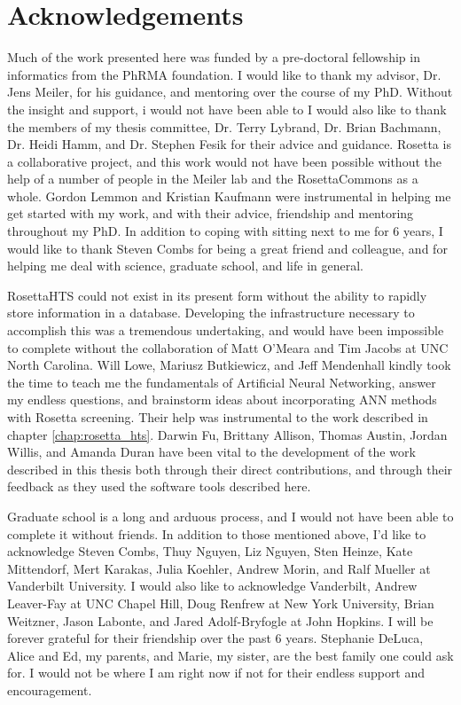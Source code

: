 \chapter*{Acknowledgements}
\vspace{7mm}

Much of the work presented here was funded by a pre-doctoral fellowship in informatics from the PhRMA foundation.
I would like to thank my advisor, Dr. Jens Meiler, for his guidance, and mentoring over the course of my PhD.
Without the insight and support, i would not have been able to 
I would also like to thank the members of my thesis committee, Dr. Terry Lybrand, Dr. Brian Bachmann, Dr. Heidi Hamm, and Dr. Stephen Fesik for their advice and guidance.
Rosetta is a collaborative project, and this work would not have been possible without the help of a number of people in the Meiler lab and the RosettaCommons as a whole.
Gordon Lemmon and Kristian Kaufmann were instrumental in helping me get started with my work, and with their advice, friendship and mentoring throughout my PhD.
In addition to coping with sitting next to me for 6 years, I would like to thank Steven Combs for being a great friend and colleague, and for helping me deal with science, graduate school, and life in general.

RosettaHTS could not exist in its present form without the ability to rapidly store information in a database.
Developing the infrastructure necessary to accomplish this was a tremendous undertaking, and would have been impossible to complete without the collaboration of Matt O'Meara and Tim Jacobs at UNC North Carolina.
Will Lowe, Mariusz Butkiewicz, and Jeff Mendenhall kindly took the time to teach me the fundamentals of Artificial Neural Networking, answer my endless questions, and brainstorm ideas about incorporating ANN methods with Rosetta screening.
Their help was instrumental to the work described in chapter \ref{chap:rosetta_hts}.
Darwin Fu, Brittany Allison, Thomas Austin, Jordan Willis, and Amanda Duran have been vital to the development of the work described in this thesis both through their direct contributions, and through their feedback as they used the software tools described here.

Graduate school is a long and arduous process, and I would not have been able to complete it without friends.
In addition to those mentioned above, I'd like to acknowledge Steven Combs, Thuy Nguyen, Liz Nguyen, Sten Heinze, Kate Mittendorf, Mert Karakas, Julia Koehler, Andrew Morin, and Ralf Mueller at Vanderbilt University.%
I would also like to acknowledge  Vanderbilt, Andrew Leaver-Fay at UNC Chapel Hill, Doug Renfrew at New York University, Brian Weitzner, Jason Labonte, and Jared Adolf-Bryfogle at John Hopkins. %
I will be forever grateful for their friendship over the past 6 years.
Stephanie DeLuca, %
Alice and Ed, my parents, and Marie, my sister, are the best family one could ask for.  I would not be where I am right now if not for their endless support and encouragement.

